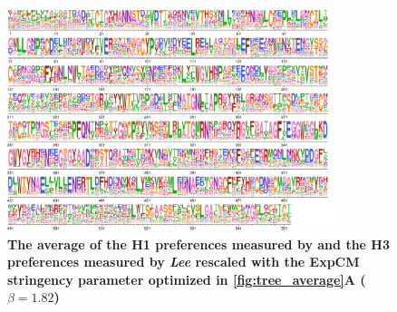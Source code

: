\documentclass[11pt]{article}
\begin{document}
\begin{figure}
\centerline{\includegraphics[width=0.85\textwidth]{figures/prefs_average}}
\caption{\label{fig:prefs_average}
\textbf{The average of the H1 preferences measured by \cite{doud2016accurate} and the H3 preferences measured by \textit{Lee} rescaled with the ExpCM stringency parameter optimized in \ref{fig:tree_average}A  ($\beta = 1.82$)}}
\end{figure}
\end{document}
